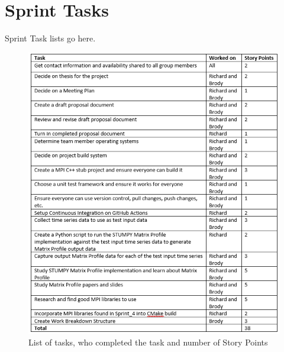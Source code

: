 \documentclass[conference]{IEEEtran}
\begin{document}
\section{Sprint Tasks}
Sprint Task lists go here.
\begin{figure}
\begin{center}
\includegraphics[scale=0.75]{tasks.png}
\caption{List of tasks, who completed the task and number of Story Points}
\end{center}
\end{figure}




\end{document}
